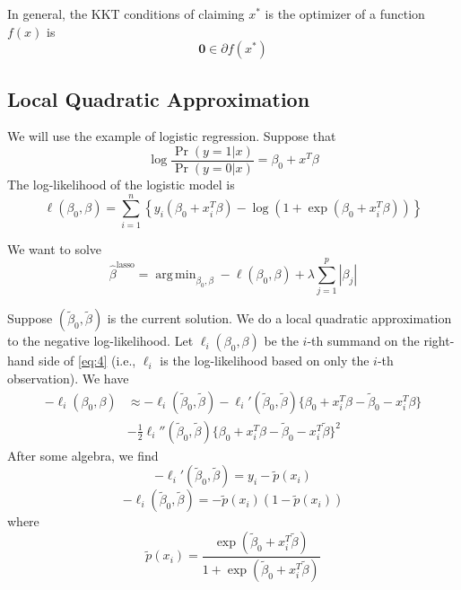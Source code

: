\documentclass[12pt]{article}
\newcommand{\sumn}{\sum_{i=1}^n}
\newcommand{\bhat}{\hat{\beta}}
\newcommand{\btilde}{\tilde{\beta}}
\DeclareMathOperator*{\argmin}{arg\,min}
\numberwithin{equation}{section}
\begin{document}
In general, the KKT conditions of claiming $x^*$ is the optimizer of a function $f(x)$ is
\begin{equation*}
  \bm{0} \in \partial f(x^*)
\end{equation*}



\newpage

\subsection{Local Quadratic Approximation}
We will use the example of logistic regression. Suppose that
\begin{equation*}
  \log \frac{\Pr(y = 1 | x)}{\Pr(y = 0 | x)} = \beta_0 + x^T \beta
\end{equation*}
%
The log-likelihood of the logistic model is
\begin{equation}
  \ell(\beta_0, \beta) = \sumn \left\{ y_i (\beta_0 + x_i^T \beta) - \log(1 + \exp(\beta_0 + x_i^T \beta)) \right\} \label{eq:4}
\end{equation}

We want to solve
\begin{equation*}
  \bhat^{\text{lasso}} = \argmin_{\beta_0, \beta} -\ell(\beta_0, \beta) + \lambda \sum_{j=1}^p |\beta_j|
\end{equation*}

Suppose $(\btilde_0, \btilde)$ is the current solution. We do a local quadratic approximation to the negative log-likelihood. Let $\ell_i(\beta_0, \beta)$ be the $i$-th summand on the right-hand side of \eqref{eq:4} (i.e., $\ell_i$ is the log-likelihood based on only the $i$-th observation). We have
\begin{align*}
  -\ell_i(\beta_0, \beta) &\approx 
       -\ell_i(\btilde_0, \btilde)
       - \ell_i'(\btilde_0, \btilde)\{ \beta_0 + x_i^T \beta - \btilde_0 - x_i^T \beta \} \\
       &-\frac{1}{2} \ell_i''(\btilde_0, \btilde) \{ \beta_0 + x_i^T \beta - \btilde_0 - x_i^T \btilde \} ^2
\end{align*}
%
After some algebra, we find
\begin{equation*}
  -\ell_i'(\btilde_0, \btilde) = y_i - \tilde{p}(x_i)
\end{equation*}
%
\begin{equation*}
 -\ell_i(\btilde_0, \btilde) = -\tilde{p}(x_i)(1 - \tilde{p}(x_i))
\end{equation*}
where
\begin{equation*}
\tilde{p}(x_i) = \frac{\exp(\btilde_0 + x_i^T \btilde)}{1 + \exp(\btilde_0 + x_i^T \btilde)}
\end{equation*}
\end{document}
